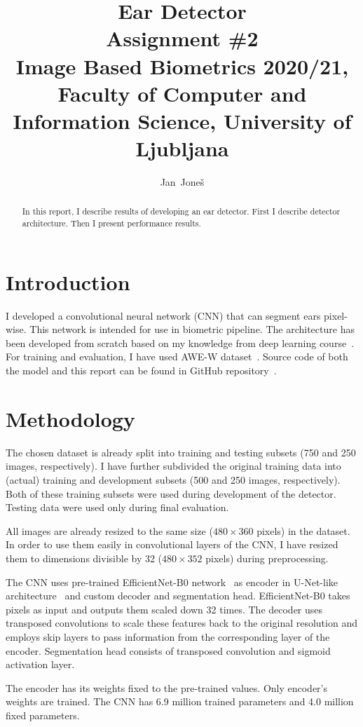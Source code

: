 \documentclass[9pt]{IEEEtran}
\title{\vspace{0ex} %
Ear Detector
\\ \large{Assignment \#2}\\ \normalsize{Image Based Biometrics 2020/21, Faculty of Computer and Information Science, University of Ljubljana}}
\author{ %
Jan~Joneš
\vspace{-4.0ex}
}
\begin{document}
\maketitle

\begin{abstract}
In this report, I describe results of developing an ear detector.
First I describe detector architecture.
Then I present performance results.
\end{abstract}

\section{Introduction}
I developed a convolutional neural network (CNN) that can segment ears pixel-wise.
This network is intended for use in biometric pipeline.
The architecture has been developed from scratch based on my knowledge from deep learning course~\cite{npfl114}.
For training and evaluation, I have used AWE-W dataset~\cite{awe}.
Source code of both the model and this report can be found in GitHub repository~\cite{repo}.

\section{Methodology}
The chosen dataset is already split into training and testing subsets (750 and 250 images, respectively).
I have further subdivided the original training data into (actual) training and development subsets (500 and 250 images, respectively).
Both of these training subsets were used during development of the detector.
Testing data were used only during final evaluation.

All images are already resized to the same size ($480 \times 360$ pixels) in the dataset.
In order to use them easily in convolutional layers of the CNN, I have resized them to dimensions divisible by 32 ($480 \times 352$ pixels) during preprocessing.

The CNN uses pre-trained EfficientNet-B0 network~\cite{efficientNet} as encoder in U-Net-like architecture~\cite{unet} and custom decoder and segmentation head.
EfficientNet-B0 takes pixels as input and outputs them scaled down 32 times. The decoder uses transposed convolutions to scale these features back to the original resolution and employs skip layers to pass information from the corresponding layer of the encoder. Segmentation head consists of transposed convolution and sigmoid activation layer.

The encoder has its weights fixed to the pre-trained values. Only encoder's weights are trained. The CNN has 6.9 million trained parameters and 4.0 million fixed parameters.
\end{document}
